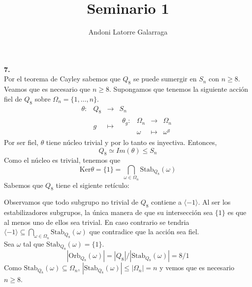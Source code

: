\documentclass{article}
\title{Seminario 1}
\author{Andoni Latorre Galarraga}
\date{}
\begin{document}
\maketitle
\textbf{7.}\\
Por el teorema de Cayley sabemos que $Q_8$ se puede sumergir en $S_n$ con $n\ge 8$. Veamos que es necesario que $n\ge 8$. Supongamos que tenemos la siguiente acción fiel de $Q_8$ sobre $\Omega_n = \{1,\dots,n\}$.
$$
\begin{array}{crcl}
\theta : & Q_8 & \longrightarrow & S_n \\
& g & \longmapsto     & \begin{array}{crcl}
\theta_g : & \Omega_n & \longrightarrow & \Omega_n \\
& \omega & \longmapsto     & \omega^g
\end{array}
\end{array}
$$
Por ser fiel, $\theta$ tiene núcleo trivial y por lo tanto es inyectiva. Entonces,
$$
Q_8 \simeq Im(\theta)\le S_n
$$
Como el núcleo es trivial, tenemos que
$$
\text{Ker}\theta = \{1\} = \bigcap_{\omega \in \Omega_n} \text{Stab}_{Q_8}(\omega)
$$
Sabemos que $Q_8$ tiene el sigiente retículo:
\begin{center}
\end{center}
Observamos que todo subgrupo no trivial de $Q_8$ contiene a $\langle -1 \rangle$. Al ser los estabilizadores subgrupos, la única manera de que su intersección sea $\{1\}$ es que al menos uno de ellos sea trivial. En caso contrario se tendria $\langle -1 \rangle \subseteq \bigcap_{\omega \in \Omega_n} \text{Stab}_{Q_8}(\omega)$ que contradice que la acción sea fiel.
\\
Sea $\omega$ tal que $\text{Stab}_{Q_8}(\omega)=\{1\}$.
$$
|\text{Orb}_{Q_8}(\omega)| = |Q_8|/|\text{Stab}_{Q_8}(\omega)| = 8/1
$$
Como $\text{Stab}_{Q_8}(\omega)\subseteq \Omega_n$, $|\text{Stab}_{Q_8}(\omega)|\leq |\Omega_n|=n$ y vemos que es necesario $n\ge 8$.
\end{document}
